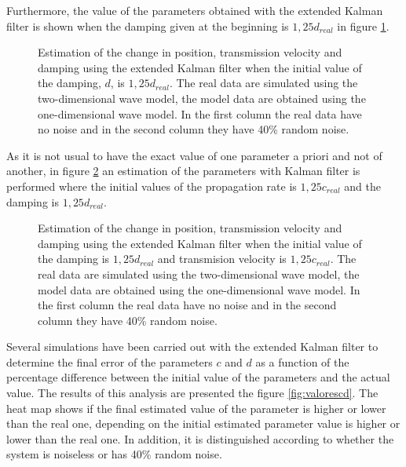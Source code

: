 \documentclass[12pt, a4paper]{article} %
\begin{document}
Furthermore, the value of the parameters obtained with the extended Kalman filter is shown when the damping given at the beginning is $1,25 d_{real}$ in figure \ref{fig:kalman1d}.

\begin{figure}[h!]
    \centering
    
    \caption{Estimation of the change in position, transmission velocity and damping using the extended Kalman filter when the initial value of the damping, $d$, is $ 1,25 d_{real}$. The real data are simulated using the two-dimensional wave model, the model data are obtained using the one-dimensional wave model. In the first column the real data have no noise and in the second column they have 40\% random noise.}
    \label{fig:kalman1d}
\end{figure}

\newpage

As it is not usual to have the exact value of one parameter a priori and not of another, in figure \ref{fig:kalman1dc} an estimation of the parameters with Kalman filter is performed where the initial values of the propagation rate is $1,25 c_{real}$ and the damping is $1,25 d_{real}$.

\newpage

\begin{figure}[h!]
    \centering
    
    \caption{Estimation of the change in position, transmission velocity and damping using the extended Kalman filter when the initial value of the damping is $1,25 d_{real}$ and transmision velocity is $1,25 c_{real}$. The real data are simulated using the two-dimensional wave model, the model data are obtained using the one-dimensional wave model. In the first column the real data have no noise and in the second column they have 40\% random noise.}
    \label{fig:kalman1dc}
\end{figure}

Several simulations have been carried out with the extended Kalman filter to determine the final error of the parameters $c$ and $d$ as a function of the percentage difference between the initial value of the parameters and the actual value. The results of this analysis are presented the figure \ref{fig:valorescd}. The heat map shows if the final estimated value of the parameter is higher or lower than the real one, depending on the initial estimated parameter value is higher or lower than the real one. In addition, it is distinguished according to whether the system is noiseless or has 40\% random noise.
\end{document}
